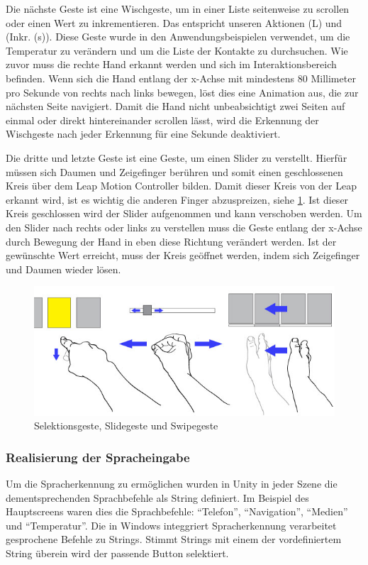 Die nächste Geste ist eine Wischgeste, um in einer Liste seitenweise zu scrollen oder einen Wert zu inkrementieren.
Das entspricht unseren Aktionen (L) und (Inkr. (s)). 
Diese Geste wurde in den Anwendungsbeispielen verwendet, um die Temperatur zu verändern und um die Liste der Kontakte zu durchsuchen. 
Wie zuvor muss die rechte Hand erkannt werden und sich im Interaktionsbereich befinden. 
Wenn sich die Hand entlang der x-Achse mit mindestens 80 Millimeter pro Sekunde von rechts nach links bewegen, löst dies eine Animation aus, die zur nächsten Seite navigiert. 
Damit die Hand nicht unbeabsichtigt zwei Seiten auf einmal oder direkt hintereinander scrollen lässt, wird die Erkennung der Wischgeste nach jeder Erkennung für eine Sekunde deaktiviert. 

Die dritte und letzte Geste ist eine Geste, um einen Slider zu verstellt. 
Hierfür müssen sich Daumen und Zeigefinger berühren und somit einen geschlossenen Kreis über dem Leap Motion Controller bilden.
Damit dieser Kreis von der Leap erkannt wird, ist es wichtig die anderen Finger abzuspreizen, siehe \ref{fig:Gestures}. 
Ist dieser Kreis geschlossen wird der Slider aufgenommen und kann verschoben werden. 
Um den Slider nach rechts oder links zu verstellen muss die Geste entlang der x-Achse durch Bewegung der Hand in eben diese Richtung verändert werden. 
Ist der gewünschte Wert erreicht, muss der Kreis geöffnet werden, indem sich Zeigefinger und Daumen wieder lösen. 
\begin{figure}[ht]
	\centering
		\includegraphics[width=1\textwidth]{img/Gestures-mit_Pfeile.jpg}
	\caption{Selektionsgeste, Slidegeste und Swipegeste}
	\label{fig:Gestures}
\end{figure}

\subsubsection[Sprache]{Realisierung der Spracheingabe}
Um die Spracherkennung zu ermöglichen wurden in Unity in jeder Szene die dementsprechenden Sprachbefehle als String definiert. 
Im Beispiel des Hauptscreens waren dies die Sprachbefehle: "`Telefon"', "`Navigation"', "`Medien"' und "`Temperatur"'. 
Die in Windows integgriert Spracherkennung verarbeitet gesprochene Befehle zu Strings.
Stimmt Strings mit einem der vordefiniertem String überein wird der passende Button selektiert. 

